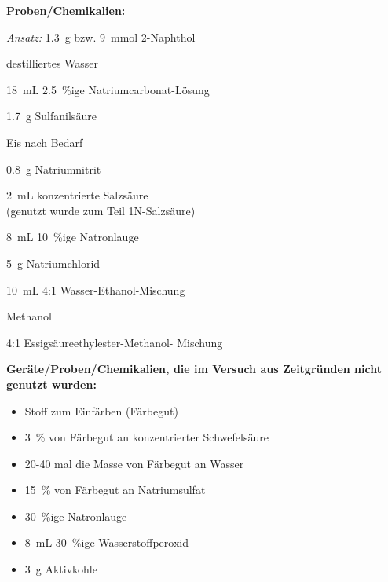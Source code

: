 \textbf{Proben/Chemikalien:}
\begin{itemize}
	\begin{minipage}{0.55 \textwidth}
		\item \textit{Ansatz:} \SI{1,3}{\gram} bzw. \SI{9}{\milli \mol} 2-Naphthol
		\item destilliertes Wasser
		\item \SI{18}{\milli \liter} \SI{2,5}{\percent}ige Natriumcarbonat-Lösung
		\item \SI{1,7}{\gram} Sulfanilsäure
		\item Eis nach Bedarf
		\item \SI{0,8}{\gram} Natriumnitrit
	\end{minipage}
	\begin{minipage}{0.45 \textwidth}
		\item \SI{2}{\milli \liter} konzentrierte Salzsäure\\ (genutzt wurde zum Teil 1N-Salzsäure)
		\item \SI{8}{\milli \liter} \SI{10}{\percent}ige Natronlauge
		\item \SI{5}{\gram} Natriumchlorid
		\item \SI{10}{\milli \liter} 4:1 Wasser-Ethanol-Mischung
		\item Methanol
		\item 4:1 Essigsäureethylester-Methanol- Mischung
	\end{minipage}
\end{itemize}

\vspace*{5mm}

\textbf{Geräte/Proben/Chemikalien, die im Versuch aus Zeitgründen nicht genutzt wurden:}
\begin{itemize}
	\item Stoff zum Einfärben (Färbegut)
	\item \SI{3}{\percent} von  Färbegut an konzentrierter Schwefelsäure
	\item 20-40 mal die Masse von Färbegut an Wasser
	\item \SI{15}{\percent} von  Färbegut an Natriumsulfat
	\item \SI{30}{\percent}ige Natronlauge
	\item \SI{8}{\milli \liter} \SI{30}{\percent}ige Wasserstoffperoxid
	\item \SI{3}{\gram} Aktivkohle
\end{itemize}



